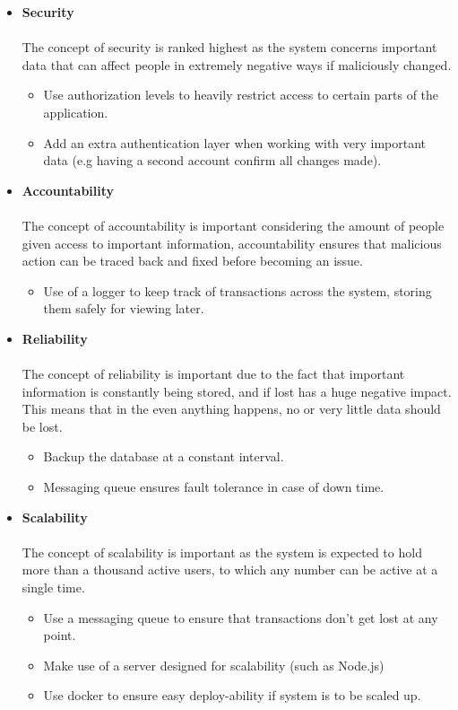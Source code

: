 \documentclass[a4paper,12pt]{article}
\begin{document}
        \begin{itemize}
        	\item \textbf{Security}\\\\
        	The concept of security is ranked highest as the system concerns important data that can affect people in extremely negative ways if maliciously changed.
        	\begin{itemize}
        		\item Use authorization levels to heavily restrict access to certain parts of the application.
        		\item Add an extra authentication layer when working with very important data (e.g having a second account confirm all changes made).
        	\end{itemize}
        	
        	\item \textbf{Accountability}\\\\
        	The concept of accountability is important considering the amount of people given access to important information, accountability ensures that malicious action can be traced back and fixed before becoming an issue.
        	\begin{itemize}
        		\item Use of a logger to keep track of transactions across the system, storing them safely for viewing later.
        	\end{itemize}
        	
        	\item \textbf{Reliability}\\\\
        	The concept of reliability is important due to the fact that important information is constantly being stored, and if lost has a huge negative impact. This means that in the even anything happens, no or very little data should be lost.
        	\begin{itemize}
        		\item Backup the database at a constant interval.
        		\item Messaging queue ensures fault tolerance in case of down time.
        	\end{itemize}
        	
        	\item \textbf{Scalability}\\\\
        	The concept of scalability is important as the system is expected to hold more than a thousand active users, to which any number can be active at a single time.
        	\begin{itemize}
        		\item Use a messaging queue to ensure that transactions don't get lost at any point.
        		\item Make use of a server designed for scalability (such as Node.js)
        		\item Use docker to ensure easy deploy-ability if system is to be scaled up.
        	\end{itemize}
        	

\end{itemize}
\end{document}
